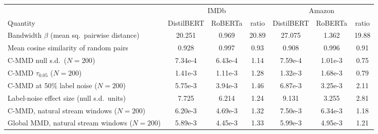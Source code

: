 \setlength{\tabcolsep}{3pt}\renewcommand{\arraystretch}{1.1}%
\begin{tabular}{>{\raggedright\arraybackslash}p{118pt}ccc|ccc}
\toprule
 & \multicolumn{3}{c|}{IMDb} & \multicolumn{3}{c}{Amazon} \\
Quantity & DistilBERT & RoBERTa & ratio & DistilBERT & RoBERTa & ratio \\
\midrule
Bandwidth $\beta$ (mean sq.\ pairwise distance) & 20.251 & 0.969 & 20.89 & 27.075 & 1.362 & 19.88 \\
Mean cosine similarity of random pairs & 0.928 & 0.997 & 0.93 & 0.908 & 0.996 & 0.91 \\
C-MMD null s.d.\ ($N{=}200$) & 7.34e-4 & 6.43e-4 & 1.14 & 7.59e-4 & 1.01e-3 & 0.75 \\
C-MMD $\tau_{0.05}$ ($N{=}200$) & 1.41e-3 & 1.11e-3 & 1.28 & 1.32e-3 & 1.68e-3 & 0.79 \\
C-MMD at 50\% label noise ($N{=}200$) & 5.75e-3 & 3.94e-3 & 1.46 & 6.87e-3 & 3.25e-3 & 2.11 \\
Label-noise effect size (null s.d.\ units) & 7.725 & 6.214 & 1.24 & 9.131 & 3.255 & 2.81 \\
C-MMD, natural stream windows ($N{=}200$) & 6.20e-3 & 4.69e-3 & 1.32 & 7.50e-3 & 6.34e-3 & 1.18 \\
Global MMD, natural stream windows ($N{=}200$) & 5.89e-3 & 4.45e-3 & 1.33 & 5.99e-3 & 4.95e-3 & 1.21 \\
\bottomrule
\end{tabular}